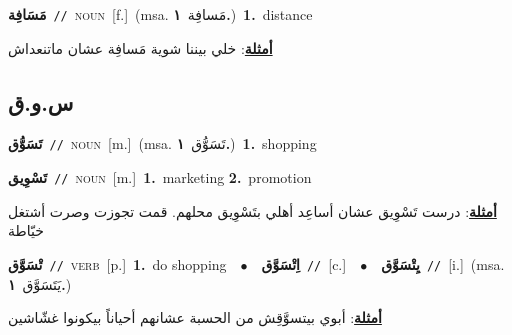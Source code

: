 \documentclass[10pt,a4paper,twoside]{article} %
\begin{document}
\begin{multicols}{2}
{\setlength\topsep{0pt}\textbf{\foreignlanguage{arabic}{مَسَافِة}}\ {\color{gray}\texttt{//}\color{black}}\ \textsc{noun}\ [f.]\ \color{gray}(msa. \foreignlanguage{arabic}{مَسافِة}~\foreignlanguage{arabic}{\textbf{١.}})\color{black}\ \textbf{1.}~distance\  \begin{flushright}\color{gray}\foreignlanguage{arabic}{\textbf{\underline{\foreignlanguage{arabic}{أمثلة}}}: خلي بيننا شوية مَسافِة عشان ماتنعداش}\end{flushright}\color{black}} \vspace{2mm}

\vspace{-3mm}
\subsection*{\color{blue}\foreignlanguage{arabic}{س.و.ق}\color{blue}{}} 

{\setlength\topsep{0pt}\textbf{\foreignlanguage{arabic}{تَسَوُّق}}\ {\color{gray}\texttt{//}\color{black}}\ \textsc{noun}\ [m.]\ \color{gray}(msa. \foreignlanguage{arabic}{تَسَوُّق}~\foreignlanguage{arabic}{\textbf{١.}})\color{black}\ \textbf{1.}~shopping\ } \vspace{2mm}

{\setlength\topsep{0pt}\textbf{\foreignlanguage{arabic}{تَسْوِيق}}\ {\color{gray}\texttt{//}\color{black}}\ \textsc{noun}\ [m.]\ \textbf{1.}~marketing  \textbf{2.}~promotion\  \begin{flushright}\color{gray}\foreignlanguage{arabic}{\textbf{\underline{\foreignlanguage{arabic}{أمثلة}}}: درست تَسْوِيق عشان أساعِد أهلي بتَسْوِيق محلهم. قمت تجوزت وصرت أشتغل خيّاطة}\end{flushright}\color{black}} \vspace{2mm}

{\setlength\topsep{0pt}\textbf{\foreignlanguage{arabic}{تْسَوَّق}}\ {\color{gray}\texttt{//}\color{black}}\ \textsc{verb}\ [p.]\ \textbf{1.}~do shopping\ \ $\bullet$\ \ \setlength\topsep{0pt}\textbf{\foreignlanguage{arabic}{اِتْسَوَّق}}\ {\color{gray}\texttt{//}\color{black}}\ [c.]\ \ $\bullet$\ \ \setlength\topsep{0pt}\textbf{\foreignlanguage{arabic}{يِتْسَوَّق}}\ {\color{gray}\texttt{//}\color{black}}\ [i.]\ \color{gray}(msa. \foreignlanguage{arabic}{يَتَسَوَّق}~\foreignlanguage{arabic}{\textbf{١.}})\color{black}\  \begin{flushright}\color{gray}\foreignlanguage{arabic}{\textbf{\underline{\foreignlanguage{arabic}{أمثلة}}}: أبوي بيتسوَّقِش من الحسبة عشانهم أحياناً بيكونوا غشّاشين}\end{flushright}\color{black}} \vspace{2mm}


\end{multicols}
\end{document}
